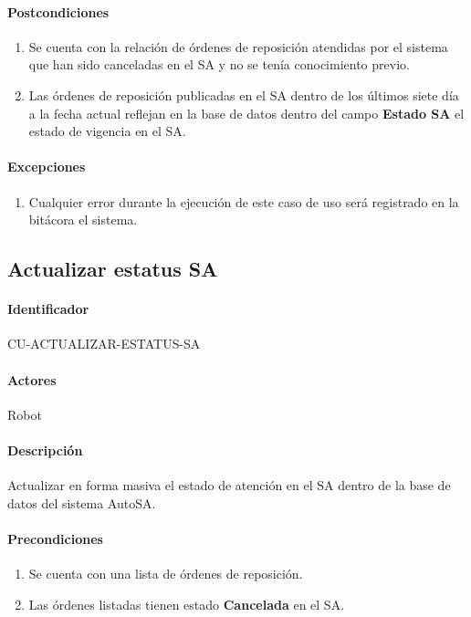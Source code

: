 \paragraph{Postcondiciones}
\begin{enumerate}
  \item Se cuenta con la relación de órdenes de reposición atendidas por el sistema que han sido canceladas en el SA y no se tenía conocimiento previo.
  \item Las órdenes de reposición publicadas en el SA dentro de los últimos siete día a la fecha actual reflejan en la base de datos dentro del campo \textbf{Estado SA} el estado de vigencia en el SA.
\end{enumerate}
\paragraph{Excepciones}
\begin{enumerate}
  \item Cualquier error durante la ejecución de este caso de uso será registrado en la bitácora el sistema.
\end{enumerate}


\subsection{Actualizar estatus SA}\label{cu-actualizar-estatus-sa}
\paragraph{Identificador}
CU-ACTUALIZAR-ESTATUS-SA
\paragraph{Actores}
Robot
\paragraph{Descripción}
Actualizar en forma masiva el estado de atención en el SA dentro de la base de datos del sistema AutoSA.
\paragraph{Precondiciones}
\begin{enumerate}
  \item Se cuenta con una lista de órdenes de reposición.
  \item Las órdenes listadas tienen estado \textbf{Cancelada} en el SA. 
\end{enumerate}
